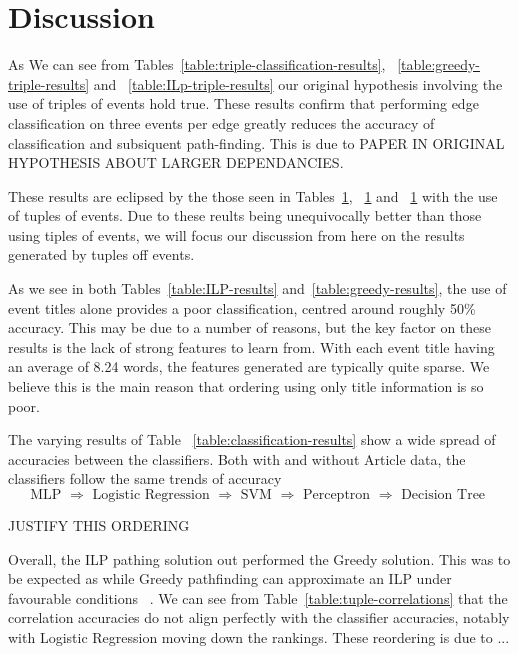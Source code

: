 \documentclass[bsc,frontabs,twoside,singlespacing,parskip,deptreport]{infthesis}     %
\begin{document}
\section{Discussion}
As We can see from Tables~\ref{table:triple-classification-results}, ~\ref{table:greedy-triple-results} and
~\ref{table:ILp-triple-results} our original hypothesis involving the use of triples of events hold true.
These results confirm that performing edge classification on three events per edge greatly reduces the
accuracy of classification and subsiquent path-finding. This is due to PAPER IN ORIGINAL HYPOTHESIS
ABOUT LARGER DEPENDANCIES.

These results are eclipsed by the those seen in Tables~\ref{}, ~\ref{} and ~\ref{} with the use of tuples of events.
Due to these reults being unequivocally better than those using tiples of events, we will focus our discussion from here on
the results generated by tuples off events.

As we see in both Tables~\ref{table:ILP-results} and~\ref{table:greedy-results}, the use of event titles alone
provides a poor classification, centred around roughly 50\% accuracy. This may be due to a number of reasons,
but the key factor on these results is the lack of strong features to learn from. With each event title having an average of
8.24 words, the features generated are typically quite sparse. We believe this is the main reason that ordering using
only title information is so poor.

The varying results of Table ~\ref{table:classification-results} show a wide spread of accuracies between the classifiers.
Both with and without Article data, the classifiers follow the same trends of accuracy
\begin{equation}
\text{MLP $\Rightarrow$ Logistic Regression $\Rightarrow$ SVM $\Rightarrow$ Perceptron $\Rightarrow$ Decision Tree }\nonumber  
\end{equation}

JUSTIFY THIS ORDERING


Overall, the ILP pathing solution out performed the Greedy solution. This was to be expected as while Greedy pathfinding can
approximate an ILP under favourable conditions ~\cite{}. We can see from Table~\ref{table:tuple-correlations} that the
correlation accuracies do not align perfectly with the classifier accuracies, notably with Logistic Regression moving
down the rankings. These reordering is due to ...
\end{document}
